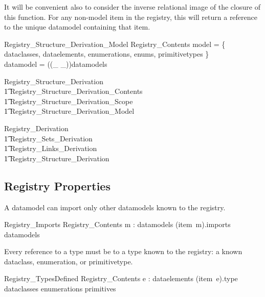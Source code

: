 \documentclass{llncs}
\def\contains{\mathrel{contains}}
\begin{document}
It will be convenient also to consider the inverse relational image of the closure of this function.  For any non-model item in the registry, this will return a reference to the unique datamodel containing that item. 

\begin{schema}{Registry\_Structure\_Derivation\_Model}
  Registry\_Contents
  \where
  \dom model = \bigcup \{ dataclasses, dataelements, enumerations, enums,
  primitivetypes \} \\
  datamodel = ((\_ \contains \_)\star)\inv \rres datamodels
\end{schema}

\begin{zed}
  Registry\_Structure\_Derivation  \\ \t1 
  Registry\_Structure\_Derivation\_Contents \land {} \\ \t1 
  Registry\_Structure\_Derivation\_Scope \land {} \\ \t1 
  Registry\_Structure\_Derivation\_Model   
\end{zed}

\begin{zed}
  Registry\_Derivation  \\ \t1 
  Registry\_Sets\_Derivation \land {} \\ \t1 
  Registry\_Links\_Derivation \land {} \\ \t1 
  Registry\_Structure\_Derivation 
\end{zed}

\subsection{Registry Properties}

A datamodel can import only other datamodels known to the registry.

\begin{schema}{Registry\_Imports}
  Registry\_Contents 
  \where
  \forall m : datamodels \spot (item~m).imports \subseteq datamodels
\end{schema}

Every reference to a type must be to a type known to the registry: a known dataclass, enumeration, or primitivetype. 

\begin{schema}{Registry\_TypesDefined}
  Registry\_Contents
  \where
  \forall e : dataelements \spot (item~e).type \in dataclasses \cup enumerations \cup
  primitives 
\end{schema}
\end{document}
